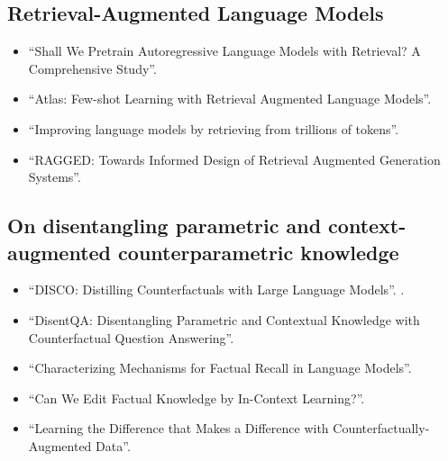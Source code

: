 \subsection{Retrieval-Augmented Language Models}
\begin{itemize}
	\item ``Shall We Pretrain Autoregressive Language Models with Retrieval? A Comprehensive Study''\cite{shall_we_pretrain_autoregressive}.
	\item ``Atlas: Few-shot Learning with Retrieval Augmented Language Models''\cite{atlas_foundational}.
	\item ``Improving language models by retrieving from trillions of tokens''\cite{retro}.
	\item ``RAGGED: Towards Informed Design of Retrieval Augmented Generation Systems''\cite{ragged}.
\end{itemize}

\subsection{On disentangling parametric and context-augmented counterparametric knowledge}
\begin{itemize}
	\item ``DISCO: Distilling Counterfactuals with Large Language Models''\cite{disco}.
		.
	\item ``DisentQA: Disentangling Parametric and Contextual Knowledge with Counterfactual Question Answering''\cite{disentqa}.
	\item ``Characterizing Mechanisms for Factual Recall in Language Models''\cite{factual_recall}.
	\item ``Can We Edit Factual Knowledge by In-Context Learning?''\cite{can_we_edit_factual_knowledge}.
	\item ``Learning the Difference that Makes a Difference with Counterfactually-Augmented Data''\cite{learning_the_difference}.
\end{itemize}

